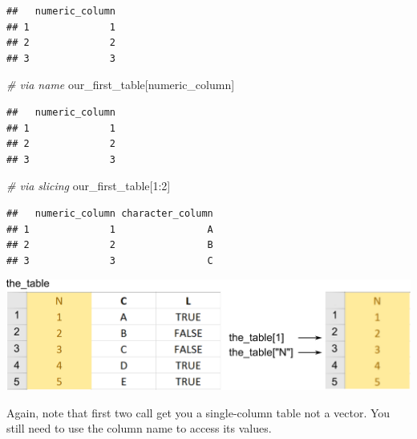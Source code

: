 \documentclass[
]{book}
\newenvironment{Shaded}{\begin{snugshade}}{\end{snugshade}}
\newcommand{\AttributeTok}[1]{\textcolor[rgb]{0.77,0.63,0.00}{#1}}
\newcommand{\CommentTok}[1]{\textcolor[rgb]{0.56,0.35,0.01}{\textit{#1}}}
\newcommand{\ConstantTok}[1]{\textcolor[rgb]{0.00,0.00,0.00}{#1}}
\newcommand{\DecValTok}[1]{\textcolor[rgb]{0.00,0.00,0.81}{#1}}
\newcommand{\FunctionTok}[1]{\textcolor[rgb]{0.00,0.00,0.00}{#1}}
\newcommand{\NormalTok}[1]{#1}
\newcommand{\OtherTok}[1]{\textcolor[rgb]{0.56,0.35,0.01}{#1}}
\newcommand{\SpecialCharTok}[1]{\textcolor[rgb]{0.00,0.00,0.00}{#1}}
\newcommand{\StringTok}[1]{\textcolor[rgb]{0.31,0.60,0.02}{#1}}
\begin{document}
\begin{verbatim}
##   numeric_column
## 1              1
## 2              2
## 3              3
\end{verbatim}

\begin{Shaded}
\begin{Highlighting}[]
\CommentTok{\# via name }
\NormalTok{our\_first\_table[}\StringTok{\textquotesingle{}numeric\_column\textquotesingle{}}\NormalTok{]}
\end{Highlighting}
\end{Shaded}

\begin{verbatim}
##   numeric_column
## 1              1
## 2              2
## 3              3
\end{verbatim}

\begin{Shaded}
\begin{Highlighting}[]
\CommentTok{\# via slicing}
\NormalTok{our\_first\_table[}\DecValTok{1}\SpecialCharTok{:}\DecValTok{2}\NormalTok{]}
\end{Highlighting}
\end{Shaded}

\begin{verbatim}
##   numeric_column character_column
## 1              1                A
## 2              2                B
## 3              3                C
\end{verbatim}

\begin{center}\includegraphics[width=1\linewidth]{images/table-subtable} \end{center}

Again, note that first two call get you a single-column table not a vector. You still need to use the column name to access its values.

\begin{Shaded}
\end{Shaded}
\end{document}
